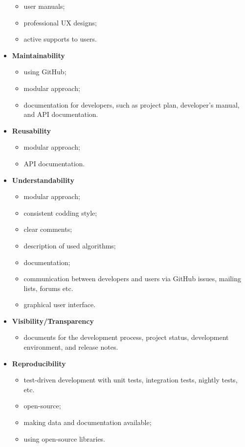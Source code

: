 \begin{itemize}
\begin{itemize}
    \item user manuals;
    \item professional UX designs;
    \item active supports to users.
\end{itemize}
\item \textbf{Maintainability}
\begin{itemize}
    \item using GitHub;
    \item modular approach;
    \item documentation for developers, such as project plan, developer’s manual, and API documentation.
\end{itemize}
\item \textbf{Reusability}
\begin{itemize}
    \item modular approach;
    \item API documentation.
\end{itemize}
\item \textbf{Understandability}
\begin{itemize}
    \item modular approach;
    \item consistent codding style;
    \item clear comments;
    \item description of used algorithms;
    \item documentation;
    \item communication between developers and users via GitHub issues, mailing lists, forums etc.
    \item graphical user interface.
\end{itemize}
\item \textbf{Visibility/Transparency}
\begin{itemize}
    \item documents for the development process, project status, development environment, and release notes.
\end{itemize}
\item \textbf{Reproducibility}
\begin{itemize}
    \item test-driven development with unit tests, integration tests, nightly tests, etc.
    \item open-source;
    \item making data and documentation available;
    \item using open-source libraries.
\end{itemize}
\end{itemize}

